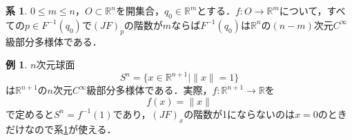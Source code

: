﻿\documentclass{jsarticle}
\theoremstyle{definition}
\newtheorem{corollary}[theorem]{系}
\newtheorem{example}[theorem]{例}
\newcommand{\euclid}[1]{\mathbb{R}^{#1}}
\begin{document}
\begin{corollary}\label{submfd}
$0\leq m \leq n$，$O\subset \euclid{n}$を開集合，$q_0\in\euclid{m}$とする．$f\colon O\to \euclid{m}$について，すべての$p\in F^{-1}(q_0)$で$(JF)_p$の階数が$m$ならば$F^{-1}(q_0)$は$\euclid{n}$の$(n-m)$次元$C^\infty$級部分多様体である．
\end{corollary}

\begin{example}
$n$次元球面
\[ S^n=\{x\in \euclid{n+1} \mid \|x\|=1 \} \]
は$\euclid{n+1}$の$n$次元$C^\infty$級部分多様体である．実際，$f\colon \euclid{n+1}\to \mathbb{R}$を
\[ f(x) = \|x\| \]
で定めると$S^n=f^{-1}(1)$であり，$(JF)_x$の階数が1にならないのは$x=0$のときだけなので系\ref{submfd}が使える．
\end{example}
\end{document}
